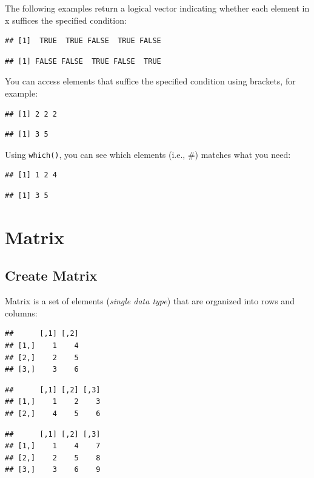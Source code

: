 \documentclass[
]{book}
\begin{document}
The following examples return a logical vector indicating whether each element in x suffices the specified condition:

\begin{verbatim}
## [1]  TRUE  TRUE FALSE  TRUE FALSE
\end{verbatim}

\begin{verbatim}
## [1] FALSE FALSE  TRUE FALSE  TRUE
\end{verbatim}

You can access elements that suffice the specified condition using brackets, for example:

\begin{verbatim}
## [1] 2 2 2
\end{verbatim}

\begin{verbatim}
## [1] 3 5
\end{verbatim}

Using \texttt{which()}, you can see which elements (i.e., \#) matches what you need:

\begin{verbatim}
## [1] 1 2 4
\end{verbatim}

\begin{verbatim}
## [1] 3 5
\end{verbatim}

\hypertarget{matrix}{%
\section{Matrix}\label{matrix}}

\hypertarget{create-matrix}{%
\subsection{Create Matrix}\label{create-matrix}}

Matrix is a set of elements (\emph{single data type}) that are organized into rows and columns:

\begin{verbatim}
##      [,1] [,2]
## [1,]    1    4
## [2,]    2    5
## [3,]    3    6
\end{verbatim}

\begin{verbatim}
##      [,1] [,2] [,3]
## [1,]    1    2    3
## [2,]    4    5    6
\end{verbatim}

\begin{verbatim}
##      [,1] [,2] [,3]
## [1,]    1    4    7
## [2,]    2    5    8
## [3,]    3    6    9
\end{verbatim}
\end{document}
